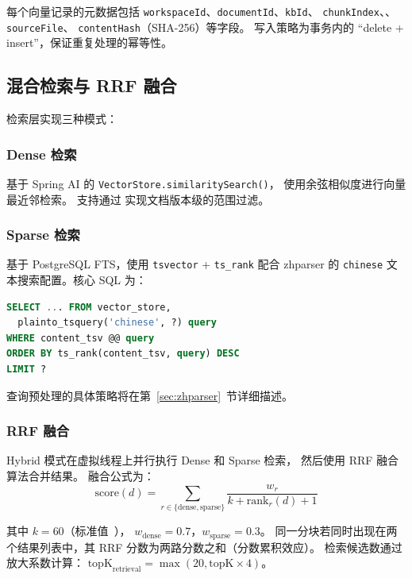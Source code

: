 \documentclass[a4paper, 12pt]{ctexart}
\begin{document}
每个向量记录的元数据包括 \texttt{workspaceId}、\texttt{documentId}、\texttt{kbId}、
\texttt{chunkIndex}、、\texttt{sourceFile}、
\texttt{contentHash}（SHA-256）等字段。
写入策略为事务内的 ``delete + insert''，保证重复处理的幂等性。

\subsection{混合检索与 RRF 融合}

检索层实现三种模式：

\subsubsection{Dense 检索}

基于 Spring AI 的 \texttt{VectorStore.similaritySearch()}，
使用余弦相似度进行向量最近邻检索。
支持通过  实现文档版本级的范围过滤。

\subsubsection{Sparse 检索}

基于 PostgreSQL FTS，使用 \texttt{tsvector} + \texttt{ts\_rank} 配合 zhparser 的
\texttt{chinese} 文本搜索配置。核心 SQL 为：

\begin{lstlisting}[language=SQL]
SELECT ... FROM vector_store,
  plainto_tsquery('chinese', ?) query
WHERE content_tsv @@ query
ORDER BY ts_rank(content_tsv, query) DESC
LIMIT ?
\end{lstlisting}

查询预处理的具体策略将在第~\ref{sec:zhparser}~节详细描述。

\subsubsection{RRF 融合}

Hybrid 模式在虚拟线程上并行执行 Dense 和 Sparse 检索，
然后使用 RRF 融合算法合并结果。
融合公式为：
\begin{equation}
  \text{score}(d) = \sum_{r \in \{\text{dense}, \text{sparse}\}}
  \frac{w_r}{k + \text{rank}_r(d) + 1}
\end{equation}

其中 $k = 60$（标准值~\cite{cormack2009rrf}），
$w_{\text{dense}} = 0.7$，$w_{\text{sparse}} = 0.3$。
同一分块若同时出现在两个结果列表中，其 RRF 分数为两路分数之和（分数累积效应）。
检索候选数通过放大系数计算：
$\text{topK}_{\text{retrieval}} = \max(20, \text{topK} \times 4)$。
\end{document}
